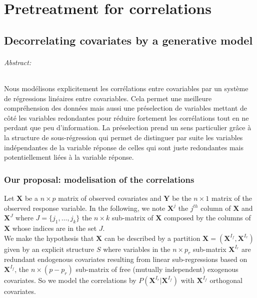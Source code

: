 \documentclass[12pt,a4paper]{report}
\begin{document}
			
\part{Pretreatment for correlations}
\chapter{Decorrelating covariates by a generative model}
\paragraph{Abstract:} Nous modélisons explicitement les corrélations entre covariables par un système de régressions linéaires entre covariables. Cela permet une meilleure compréhension des données mais aussi une préselection de variables mettant de côté les variables redondantes pour réduire fortement les corrélations tout en ne perdant que peu d'information. La préselection prend un sens particulier grâce à la structure de sous-régression qui permet de distinguer par suite les variables indépendantes de la variable réponse de celles qui sont juste redondantes mais potentiellement liées à la variable réponse.
\\

\section{Our proposal: modelisation of the correlations}
	Let $\boldsymbol{X}$ be a $n \times p$ matrix of observed covariates and $\boldsymbol{Y}$ be the $n \times 1$ matrix of the observed response variable. In the following, we note $\boldsymbol{X}^j$ the $j^{th}$ column of $\boldsymbol{X}$ and $\boldsymbol{X}^{J}$ where $J=\{j_1,\dots,j_k\}$ the $n\times k$ sub-matrix of $\boldsymbol{X}$ composed by the columns of $\boldsymbol{X}$ whose indices are in the set $J$. 
\\

We make the hypothesis that $\boldsymbol{X}$ can be described by a partition $\boldsymbol{X}=(\boldsymbol{X}^{I_f},\boldsymbol{X}^{I_r}) $ given by an explicit structure $S$ where variables in the $n\times p_r$ sub-matrix $\boldsymbol{X}^{I_r}$ are redundant endogenous covariates resulting from linear sub-regressions based on $\boldsymbol{X}^{I_f}$, the  $n\times (p-p_r)$ sub-matrix of free (mutually independent) exogenous covariates.
So we model the correlations by $P(\boldsymbol{X}^{I_r}|\boldsymbol{X}^{I_f}) $ with $\boldsymbol{X}^{I_f}$ orthogonal covariates.
 
\end{document}
